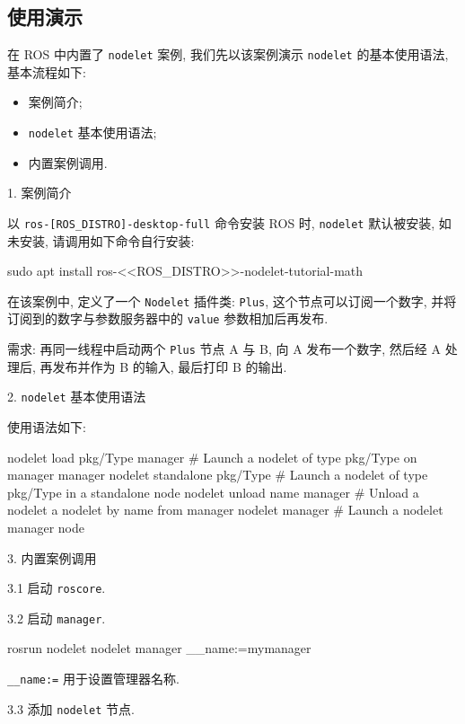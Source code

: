 \documentclass[openany, fontset=windowsold]{ctexbook}
\theoremstyle{kaiti}
\theoremstyle{normal}
\begin{document}
\subsection{使用演示}

在 ROS 中内置了 \verb|nodelet| 案例, 我们先以该案例演示 \verb|nodelet| 的基本使用语法, 基本流程如下:

\begin{itemize}
  \item 案例简介; 
  \item \verb|nodelet| 基本使用语法; 
  \item 内置案例调用.
\end{itemize}

1. 案例简介

以 \verb|ros-[ROS_DISTRO]-desktop-full| 命令安装 ROS 时,  \verb|nodelet| 默认被安装, 如未安装, 请调用如下命令自行安装:

\begin{bash}
  sudo apt install ros-<<ROS_DISTRO>>-nodelet-tutorial-math
\end{bash}

在该案例中, 定义了一个 \verb|Nodelet| 插件类: \verb|Plus|, 这个节点可以订阅一个数字, 并将订阅到的数字与参数服务器中的 \verb|value| 参数相加后再发布.

需求: 再同一线程中启动两个 \verb|Plus| 节点 A 与 B, 向 A 发布一个数字, 然后经 A 处理后, 再发布并作为 B 的输入, 最后打印 B 的输出.

2. \verb|nodelet| 基本使用语法

使用语法如下:

\begin{bash}
  nodelet load pkg/Type manager # Launch a nodelet of type pkg/Type on manager manager
  nodelet standalone pkg/Type   # Launch a nodelet of type pkg/Type in a standalone node
  nodelet unload name manager   # Unload a nodelet a nodelet by name from manager
  nodelet manager               # Launch a nodelet manager node
\end{bash}

3. 内置案例调用

3.1 启动 \verb|roscore|.

3.2 启动 \verb|manager|.

\begin{bash}
  rosrun nodelet nodelet manager __name:=mymanager
\end{bash}

\verb|__name:=| 用于设置管理器名称.

3.3 添加 \verb|nodelet| 节点.
\end{document}
